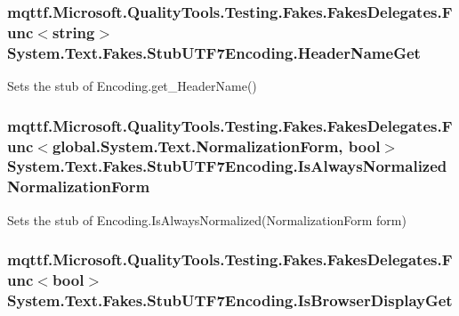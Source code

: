 \hypertarget{class_system_1_1_text_1_1_fakes_1_1_stub_u_t_f7_encoding_aa0c1d7cd3bd90675ad8f0ad1c70c333b}{
\subsubsection[{Header\-Name\-Get}]{\setlength{\rightskip}{0pt plus 5cm}mqttf.\-Microsoft.\-Quality\-Tools.\-Testing.\-Fakes.\-Fakes\-Delegates.\-Func$<$string$>$ System.\-Text.\-Fakes.\-Stub\-U\-T\-F7\-Encoding.\-Header\-Name\-Get}}\label{class_system_1_1_text_1_1_fakes_1_1_stub_u_t_f7_encoding_aa0c1d7cd3bd90675ad8f0ad1c70c333b}


Sets the stub of Encoding.\-get\-\_\-\-Header\-Name()

\hypertarget{class_system_1_1_text_1_1_fakes_1_1_stub_u_t_f7_encoding_a341472ee0175f2c6aaa052d7dd7c1a6a}{
\subsubsection[{Is\-Always\-Normalized\-Normalization\-Form}]{\setlength{\rightskip}{0pt plus 5cm}mqttf.\-Microsoft.\-Quality\-Tools.\-Testing.\-Fakes.\-Fakes\-Delegates.\-Func$<$global.\-System.\-Text.\-Normalization\-Form, bool$>$ System.\-Text.\-Fakes.\-Stub\-U\-T\-F7\-Encoding.\-Is\-Always\-Normalized\-Normalization\-Form}}\label{class_system_1_1_text_1_1_fakes_1_1_stub_u_t_f7_encoding_a341472ee0175f2c6aaa052d7dd7c1a6a}


Sets the stub of Encoding.\-Is\-Always\-Normalized(\-Normalization\-Form form)

\hypertarget{class_system_1_1_text_1_1_fakes_1_1_stub_u_t_f7_encoding_ab608bdd2a9b044431ba47aa429a01a4b}{
\subsubsection[{Is\-Browser\-Display\-Get}]{\setlength{\rightskip}{0pt plus 5cm}mqttf.\-Microsoft.\-Quality\-Tools.\-Testing.\-Fakes.\-Fakes\-Delegates.\-Func$<$bool$>$ System.\-Text.\-Fakes.\-Stub\-U\-T\-F7\-Encoding.\-Is\-Browser\-Display\-Get}}\label{class_system_1_1_text_1_1_fakes_1_1_stub_u_t_f7_encoding_ab608bdd2a9b044431ba47aa429a01a4b}


